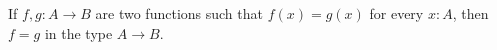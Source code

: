 \documentclass[hott-all.tex]{subfiles}
\begin{document}
% 
% 
\begin{lem}
  If $f,g:A\to{}B$ are two functions such that $f(x)=g(x)$ for every $x:A$, then
  $f=g$ in the type $A\to{}B$.
\end{lem}
% 
% 
% 
% 
\end{document}
